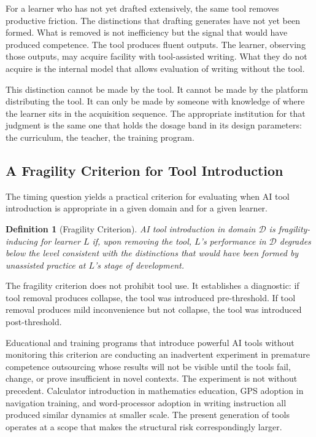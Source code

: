 \documentclass[11pt]{article}
\newtheorem{definition}{Definition}
\theoremstyle{remark}
\begin{document}
For a learner who has not yet drafted extensively, the same tool removes productive friction. The distinctions that drafting generates have not yet been formed. What is removed is not inefficiency but the signal that would have produced competence. The tool produces fluent outputs. The learner, observing those outputs, may acquire facility with tool-assisted writing. What they do not acquire is the internal model that allows evaluation of writing without the tool.

This distinction cannot be made by the tool. It cannot be made by the platform distributing the tool. It can only be made by someone with knowledge of where the learner sits in the acquisition sequence. The appropriate institution for that judgment is the same one that holds the dosage band in its design parameters: the curriculum, the teacher, the training program.

\subsection{A Fragility Criterion for Tool Introduction}

The timing question yields a practical criterion for evaluating when AI tool introduction is appropriate in a given domain and for a given learner.

\begin{definition}[Fragility Criterion]
\label{def:fragility_criterion}
AI tool introduction in domain $\mathcal{D}$ is fragility-inducing for learner $L$ if, upon removing the tool, $L$'s performance in $\mathcal{D}$ degrades below the level consistent with the distinctions that would have been formed by unassisted practice at $L$'s stage of development.
\end{definition}

The fragility criterion does not prohibit tool use. It establishes a diagnostic: if tool removal produces collapse, the tool was introduced pre-threshold. If tool removal produces mild inconvenience but not collapse, the tool was introduced post-threshold.

Educational and training programs that introduce powerful AI tools without monitoring this criterion are conducting an inadvertent experiment in premature competence outsourcing whose results will not be visible until the tools fail, change, or prove insufficient in novel contexts. The experiment is not without precedent. Calculator introduction in mathematics education, GPS adoption in navigation training, and word-processor adoption in writing instruction all produced similar dynamics at smaller scale. The present generation of tools operates at a scope that makes the structural risk correspondingly larger.
\end{document}
